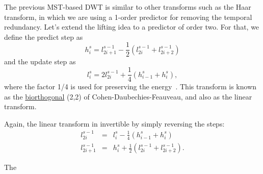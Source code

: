 The previous MST-based DWT is similar to other transforms such as the
Haar transform, in which we are using a 1-order predictor for removing
the temporal redundancy. Let's extend the lifting idea to a predictor
of order two. For that, we define the predict step as
\begin{equation}
  h^s_i = l^{s-1}_{2i+1} - \frac{1}{2}(l^{s-1}_{2i} + l^{s-1}_{2i+2})
\end{equation}
and the update step as
\begin{equation}
  l^s_i = 2l^{s-1}_{2i} + \frac{1}{4}(h^s_{i-1} + h^s_i),
\end{equation}
where the factor 1/4 is used for preserving the
energy~\cite{sweldens1997building}. This transform is known as the
\href{https://en.wikipedia.org/wiki/Biorthogonal_wavelet}{biorthogonal}
(2,2) of Cohen-Daubechies-Feauveau, and also as the linear transform.

Again, the linear transform in invertible by simply reversing the
steps:
\begin{equation}
  \begin{array}{rcl}
    l^{s-1}_{2i} & = & l^s_i - \frac{1}{4}(h^s_{i-1} + h^s_i)\\
    l^{s-1}_{2i+1} & = & h^s_i + \frac{1}{2}(l^{s-1}_{2i} + l^{s-1}_{2i+2}).
  \end{array}
\end{equation}

The 
  
